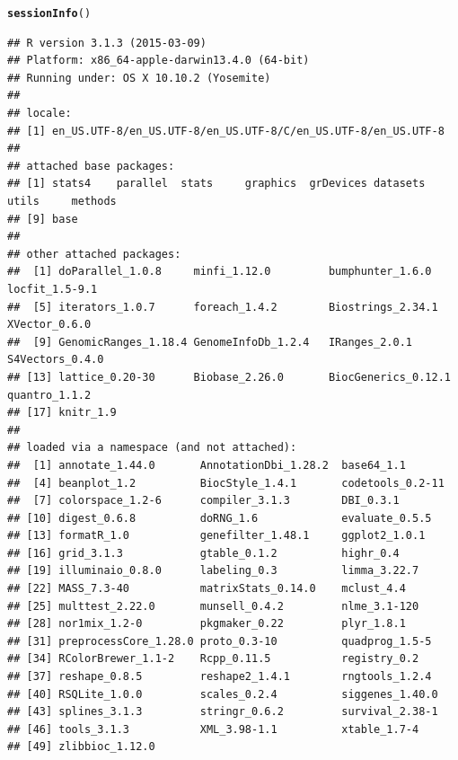 \documentclass{article}\usepackage[]{graphicx}\usepackage[usenames,dvipsnames]{color}
\makeatletter
\newcommand{\hlstd}[1]{\textcolor[rgb]{0.345,0.345,0.345}{#1}}%
\newcommand{\hlkwd}[1]{\textcolor[rgb]{0.737,0.353,0.396}{\textbf{#1}}}%
\newenvironment{kframe}{%
 \def\at@end@of@kframe{}%
 \ifinner\ifhmode%
  \def\at@end@of@kframe{\end{minipage}}%
  \begin{minipage}{\columnwidth}%
 \fi\fi%
 \def\FrameCommand##1{\hskip\@totalleftmargin \hskip-\fboxsep
 \colorbox{shadecolor}{##1}\hskip-\fboxsep
     \hskip-\linewidth \hskip-\@totalleftmargin \hskip\columnwidth}%
 \MakeFramed {\advance\hsize-\width
   \@totalleftmargin\z@ \linewidth\hsize
   \@setminipage}}%
 {\par\unskip\endMakeFramed%
 \at@end@of@kframe}
\newenvironment{knitrout}{}{} %
\makeatother
\begin{document}
\begin{knitrout}
\color{fgcolor}\begin{kframe}
\begin{alltt}
\hlkwd{sessionInfo}\hlstd{()}
\end{alltt}
\begin{verbatim}
## R version 3.1.3 (2015-03-09)
## Platform: x86_64-apple-darwin13.4.0 (64-bit)
## Running under: OS X 10.10.2 (Yosemite)
## 
## locale:
## [1] en_US.UTF-8/en_US.UTF-8/en_US.UTF-8/C/en_US.UTF-8/en_US.UTF-8
## 
## attached base packages:
## [1] stats4    parallel  stats     graphics  grDevices datasets  utils     methods  
## [9] base     
## 
## other attached packages:
##  [1] doParallel_1.0.8     minfi_1.12.0         bumphunter_1.6.0     locfit_1.5-9.1      
##  [5] iterators_1.0.7      foreach_1.4.2        Biostrings_2.34.1    XVector_0.6.0       
##  [9] GenomicRanges_1.18.4 GenomeInfoDb_1.2.4   IRanges_2.0.1        S4Vectors_0.4.0     
## [13] lattice_0.20-30      Biobase_2.26.0       BiocGenerics_0.12.1  quantro_1.1.2       
## [17] knitr_1.9           
## 
## loaded via a namespace (and not attached):
##  [1] annotate_1.44.0       AnnotationDbi_1.28.2  base64_1.1           
##  [4] beanplot_1.2          BiocStyle_1.4.1       codetools_0.2-11     
##  [7] colorspace_1.2-6      compiler_3.1.3        DBI_0.3.1            
## [10] digest_0.6.8          doRNG_1.6             evaluate_0.5.5       
## [13] formatR_1.0           genefilter_1.48.1     ggplot2_1.0.1        
## [16] grid_3.1.3            gtable_0.1.2          highr_0.4            
## [19] illuminaio_0.8.0      labeling_0.3          limma_3.22.7         
## [22] MASS_7.3-40           matrixStats_0.14.0    mclust_4.4           
## [25] multtest_2.22.0       munsell_0.4.2         nlme_3.1-120         
## [28] nor1mix_1.2-0         pkgmaker_0.22         plyr_1.8.1           
## [31] preprocessCore_1.28.0 proto_0.3-10          quadprog_1.5-5       
## [34] RColorBrewer_1.1-2    Rcpp_0.11.5           registry_0.2         
## [37] reshape_0.8.5         reshape2_1.4.1        rngtools_1.2.4       
## [40] RSQLite_1.0.0         scales_0.2.4          siggenes_1.40.0      
## [43] splines_3.1.3         stringr_0.6.2         survival_2.38-1      
## [46] tools_3.1.3           XML_3.98-1.1          xtable_1.7-4         
## [49] zlibbioc_1.12.0
\end{verbatim}
\end{kframe}
\end{knitrout}



\end{document}
